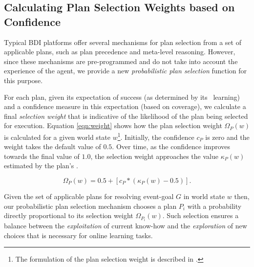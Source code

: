 \subsection{Calculating Plan Selection Weights based on Confidence}


Typical BDI platforms offer several mechanisms for plan selection from a set of applicable plans, such as plan precedence and meta-level reasoning. However, since these mechanisms are pre-programmed and do not take into account the experience of the agent, we provide a new \textit{probabilistic plan selection} function for this purpose. 

For each plan, given its expectation of success (as determined by its \dt\ learning) and a confidence measure in this expectation (based on coverage), we calculate a final \textit{selection weight} that is indicative of the likelihood of the plan being selected for execution. Equation \ref{eqn:weight} shows how the plan selection weight $\Omega_P(w)$ is calculated for a given world state $w$\footnote{The formulation of the plan selection weight is described in \cite{Singh:AAMAS10}.}. Initially, the confidence $c_P$ is zero and the weight takes the default value of $0.5$. Over time, as the confidence improves towards the final value of $1.0$, the selection weight approaches the value $\kappa_P(w)$ estimated by the plan's \dt.


\begin{equation}\label{eqn:weight}   
\Omega_P(w) = 0.5 + \left[  c_P *  \left( \kappa_P(w) - 0.5 \right)  \right].
\end{equation}


Given the set of applicable plans for resolving event-goal $G$ in world state $w$ then, our probabilistic plan selection mechanism chooses a plan $P_i$ with a probability directly proportional to its selection weight $\Omega_{P_i}(w)$. Such selection ensures a balance between the \emph{exploitation} of current know-how and the \textit{exploration} of new choices that is necessary for online learning tasks. 



